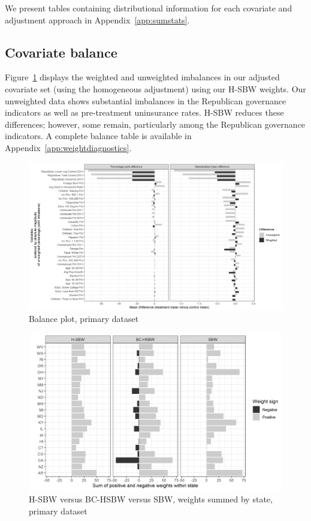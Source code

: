 \documentclass[aoas]{imsart}
\theoremstyle{plain}
\theoremstyle{remark}
\begin{document}
We present tables containing distributional information for each covariate and adjustment approach in Appendix~\ref{app:sumstats}. 

\subsection{Covariate balance}

Figure~\ref{fig:loveplotc1} displays the weighted and unweighted imbalances in our adjusted covariate set (using the homogeneous adjustment) using our H-SBW weights. Our unweighted data shows substantial imbalances in the Republican governance indicators as well as pre-treatment uninsurance rates. H-SBW reduces these differences; however, some remain, particularly among the Republican governance indicators. A complete balance table is available in Appendix~\ref{app:weightdiagnostics}. 

\begin{figure}[H]
\begin{center}
    \caption{Balance plot, primary dataset}\label{fig:loveplotc1}
    \includegraphics[scale=0.45]{01_Plots/balance-plot-all-etuc1.png}
\end{center}
\end{figure}

\begin{figure}[H]
\begin{center}
    \caption{H-SBW versus BC-HSBW versus SBW, weights summed by state, primary dataset}
    \label{fig:sbwvhsbw1}
    \includegraphics[scale=0.55]{01_Plots/weights-by-state-sbw-hsbw-c1.png}
\end{center}
\end{figure}
\end{document}
